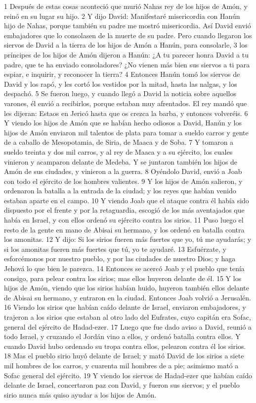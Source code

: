 1 Después de estas cosas aconteció que murió Nahas rey de los hijos de Amón, y reinó en su lugar su hijo.
2 Y dijo David: Manifestaré misericordia con Hanún hijo de Nahas, porque también su padre me mostró misericordia. Así David envió embajadores que lo consolasen de la muerte de su padre. Pero cuando llegaron los siervos de David a la tierra de los hijos de Amón a Hanún, para consolarle,
3 los príncipes de los hijos de Amón dijeron a Hanún: ¿A tu parecer honra David a tu padre, que te ha enviado consoladores? ¿No vienen más bien sus siervos a ti para espiar, e inquirir, y reconocer la tierra?
4 Entonces Hanún tomó los siervos de David y los rapó, y les cortó los vestidos por la mitad, hasta las nalgas, y los despachó.
5 Se fueron luego, y cuando llegó a David la noticia sobre aquellos varones, él envió a recibirlos, porque estaban muy afrentados. El rey mandó que les dijeran: Estaos en Jericó hasta que os crezca la barba, y entonces volveréis.
6 Y viendo los hijos de Amón que se habían hecho odiosos a David, Hanún y los hijos de Amón enviaron mil talentos de plata   para tomar a sueldo carros y gente de a caballo de Mesopotamia, de Siria, de Maaca y de Soba.
7 Y tomaron a sueldo treinta y dos mil carros, y al rey de Maaca y a su ejército, los cuales vinieron y acamparon delante de Medeba. Y se juntaron también los hijos de Amón de sus ciudades, y vinieron a la guerra.
8 Oyéndolo David, envió a Joab con todo el ejército de los hombres valientes.
9 Y los hijos de Amón salieron, y ordenaron la batalla a la entrada de la ciudad; y los reyes que habían venido estaban aparte en el campo.
10 Y viendo Joab que el ataque contra él había sido dispuesto por el frente y por la retaguardia, escogió de los más aventajados que había en Israel, y con ellos ordenó su ejército contra los sirios.
11 Puso luego el resto de la gente en mano de Abisai su hermano, y los ordenó en batalla contra los amonitas.
12 Y dijo: Si los sirios fueren más fuertes que yo, tú me ayudarás; y si los amonitas fueren más fuertes que tú, yo te ayudaré.
13 Esfuérzate, y esforcémonos por nuestro pueblo, y por las ciudades de nuestro Dios; y haga Jehová lo que bien le parezca.
14 Entonces se acercó Joab y el pueblo que tenía consigo, para pelear contra los sirios; mas ellos huyeron delante de él.
15 Y los hijos de Amón, viendo que los sirios habían huido, huyeron también ellos delante de Abisai su hermano, y entraron en la ciudad. Entonces Joab volvió a Jerusalén.
16 Viendo los sirios que habían caído delante de Israel, enviaron embajadores, y trajeron a los sirios que estaban al otro lado del Eufrates, cuyo capitán era Sofac, general del ejército de Hadad-ezer.
17 Luego que fue dado aviso a David, reunió a todo Israel, y cruzando el Jordán vino a ellos, y ordenó batalla contra ellos. Y cuando David hubo ordenado su tropa contra ellos, pelearon contra él los sirios.
18 Mas el pueblo sirio huyó delante de Israel; y mató David de los sirios a siete mil hombres de los carros, y cuarenta mil hombres de a pie; asimismo mató a Sofac general del ejército.
19 Y viendo los siervos de Hadad-ezer que habían caído delante de Israel, concertaron paz con David, y fueron sus siervos; y el pueblo sirio nunca más quiso ayudar a los hijos de Amón.

